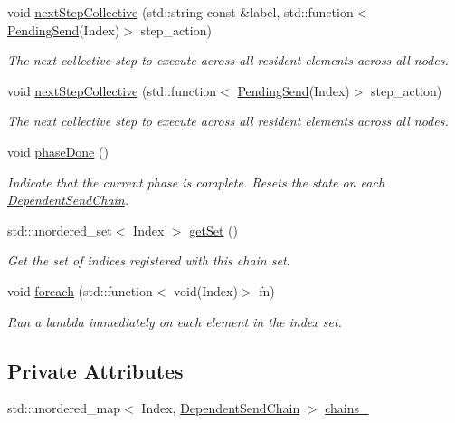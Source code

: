 \begin{DoxyCompactItemize}
void \hyperlink{classvt_1_1messaging_1_1_collection_chain_set_a095bc4907c3bd60668483de52b79b08e}{next\+Step\+Collective} (std\+::string const \&label, std\+::function$<$ \hyperlink{structvt_1_1messaging_1_1_pending_send}{Pending\+Send}(Index)$>$ step\+\_\+action)
\begin{DoxyCompactList}\small\item\em The next collective step to execute across all resident elements across all nodes. \end{DoxyCompactList}\item 
void \hyperlink{classvt_1_1messaging_1_1_collection_chain_set_a7d226984e696278b9ca7e539c974bab4}{next\+Step\+Collective} (std\+::function$<$ \hyperlink{structvt_1_1messaging_1_1_pending_send}{Pending\+Send}(Index)$>$ step\+\_\+action)
\begin{DoxyCompactList}\small\item\em The next collective step to execute across all resident elements across all nodes. \end{DoxyCompactList}\item 
void \hyperlink{classvt_1_1messaging_1_1_collection_chain_set_afcb749b22063068d060f35fdcd2320b3}{phase\+Done} ()
\begin{DoxyCompactList}\small\item\em Indicate that the current phase is complete. Resets the state on each {\ttfamily \hyperlink{classvt_1_1messaging_1_1_dependent_send_chain}{Dependent\+Send\+Chain}}. \end{DoxyCompactList}\item 
std\+::unordered\+\_\+set$<$ Index $>$ \hyperlink{classvt_1_1messaging_1_1_collection_chain_set_a17bcba0392b2ae7c68a3c3630b71ffa3}{get\+Set} ()
\begin{DoxyCompactList}\small\item\em Get the set of indices registered with this chain set. \end{DoxyCompactList}\item 
void \hyperlink{classvt_1_1messaging_1_1_collection_chain_set_a5768b5b636799860a63ab182a1e34c9a}{foreach} (std\+::function$<$ void(Index)$>$ fn)
\begin{DoxyCompactList}\small\item\em Run a lambda immediately on each element in the index set. \end{DoxyCompactList}\end{DoxyCompactItemize}
\subsection*{Private Attributes}
\begin{DoxyCompactItemize}
\item 
std\+::unordered\+\_\+map$<$ Index, \hyperlink{classvt_1_1messaging_1_1_dependent_send_chain}{Dependent\+Send\+Chain} $>$ \hyperlink{classvt_1_1messaging_1_1_collection_chain_set_afd05e48d93d231320364149fd538beab}{chains\+\_\+}
\end{DoxyCompactItemize}


